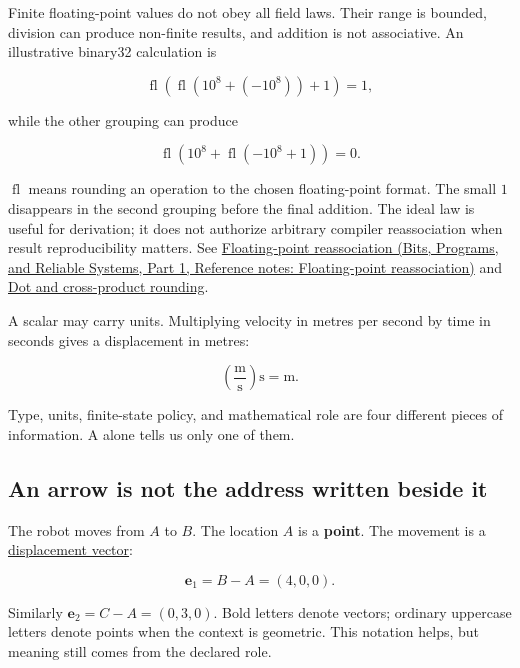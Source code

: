 Finite floating-point values do not obey all field laws. Their range is bounded, division can produce non-finite results, and addition is not associative. An illustrative binary32 calculation is

\[
\operatorname{fl}\!\left(\operatorname{fl}(10^8+(-10^8))+1\right)=1,
\]

while the other grouping can produce

\[
\operatorname{fl}\!\left(10^8+\operatorname{fl}(-10^8+1)\right)=0.
\]

\(\operatorname{fl}\) means rounding an operation to the chosen floating-point format. The small \(1\) disappears in the second grouping before the final addition. The ideal law is useful for derivation; it does not authorize arbitrary compiler reassociation when result reproducibility matters. See \href{../01-Bits-Programs-and-Reliable-Systems-P01/main.pdf\#nameddest=appendix-c2ac4a84c283}{Floating-point reassociation (Bits, Programs, and Reliable Systems, Part 1, Reference notes: Floating-point reassociation)} and \hyperref[appendix-5aef4f13483a]{Dot and cross-product rounding}.

A scalar may carry units. Multiplying velocity in metres per second by time in seconds gives a displacement in metres:

\[
\left(\frac{\mathrm m}{\mathrm s}\right)\mathrm s=\mathrm m.
\]

Type, units, finite-state policy, and mathematical role are four different pieces of information. A  alone tells us only one of them.

\subsection{An arrow is not the address written beside it}\label{01-foundations-i-ch017-an-arrow-is-not-the-address-written-beside-it}

\hypertarget{01-foundations-i-ch017-an-arrow-is-not-the-address-written-beside-it}{}

The robot moves from \(A\) to \(B\). The location \(A\) is a \textbf{point}. The movement is a \hyperref[01-foundations-i-ch017-an-arrow-is-not-the-address-written-beside-it]{displacement vector}:

\[
\mathbf e_1=B-A=(4,0,0).
\]

Similarly \(\mathbf e_2=C-A=(0,3,0)\). Bold letters denote vectors; ordinary uppercase letters denote points when the context is geometric. This notation helps, but meaning still comes from the declared role.

